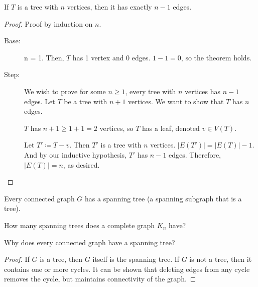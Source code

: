 \documentclass[a4paper]{article}
\begin{document}
\begin{theorem}
	If \( T \) is a tree with \( n \) vertices, then it has exactly \( n-1 \) edges.
\end{theorem}
\begin{proof}
	Proof by induction on \( n \). \par
	\begin{description}
		\item[Base:]  n = 1. Then, \( T \) has 1 vertex and 0 edges. \( 1 - 1 = 0 \), so the theorem holds.
		\item[Step:] We wish to prove for some \( n \ge 1 \), every tree with \( n \) vertices has \( n - 1 \) edges. Let \( T \) be a tree with \( n + 1 \) vertices. We want to show that \( T \) has \( n \) edges.
			\begin{note}
				\( T \) has \( n + 1 \ge 1 + 1 = 2 \) vertices, so \( T \) has a leaf, denoted \( v \in  V(T) \).
			\end{note}
			Let \( T' \coloneqq T - v \). Then \( T' \) is a tree with \( n \) vertices. \( |E(T')| = |E(T)| - 1 \). And by our inductive hypothesis, \( T' \) has \( n - 1 \) edges. Therefore, \( |E(T)| = n \), as desired.
	\end{description}
\end{proof}

\begin{property}
	Every connected graph \( G \) has a spanning tree (a spanning subgraph that is a tree).
\end{property}
How many spanning trees does a complete graph \( K_n \) have?


Why does every connected graph have a spanning tree?
\begin{proof}
	If \( G \) is a tree, then \( G \) itself is the spanning tree. If \( G \) is not a tree, then it contains one or more cycles. It can be shown that deleting edges from any cycle removes the cycle, but maintains connectivity of the graph.
\end{proof}
\end{document}
